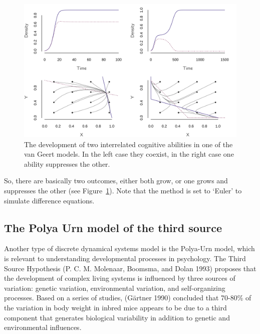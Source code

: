 \documentclass[
  a4paper,
  DIV=11,
  numbers=noendperiod,
  oneside]{scrreprt}
\begin{document}
\begin{figure}

{\centering \includegraphics{media/ch4n/fig-ch4n-img11-old-59.png}

}

\caption{\label{fig-ch4n-img11-old-59}The development of two
interrelated cognitive abilities in one of the van Geert models. In the
left case they coexist, in the right case one ability suppresses the
other.}

\end{figure}

So, there are basically two outcomes, either both grow, or one grows and
suppresses the other (see Figure~\ref{fig-ch4n-img11-old-59}). Note that
the method is set to `Euler' to simulate difference equations.

\hypertarget{sec-The-Polya-Urn-model-of-the-third-source}{%
\subsection{The Polya Urn model of the third
source}\label{sec-The-Polya-Urn-model-of-the-third-source}}

Another type of discrete dynamical systems model is the Polya-Urn model,
which is relevant to understanding developmental processes in
psychology. The Third Source Hypothesis (P. C. M. Molenaar, Boomsma, and
Dolan 1993) proposes that the development of complex living systems is
influenced by three sources of variation: genetic variation,
environmental variation, and self-organizing processes. Based on a
series of studies, (Gärtner 1990) concluded that 70-80\% of the
variation in body weight in inbred mice appears to be due to a third
component that generates biological variability in addition to genetic
and environmental influences.
\end{document}

